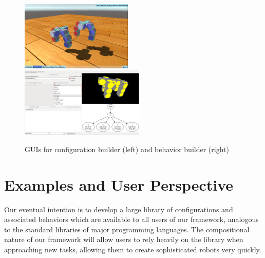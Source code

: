 \documentclass[graybox]{svmult}
\begin{document}
\begin{figure}
\begin{center}
    \includegraphics[height=1.3in]{images/library/unity/config_designer.png}
    \includegraphics[height=1.3in]{images/gait_window.png}
    \caption{GUIs for configuration builder (left) and behavior builder (right)}
    \label{fig:smores_conf}
\end{center}
\end{figure}

%
\section{Examples and User Perspective}
\label{sec:examples}
Our eventual intention is to develop a large library of configurations and associated
behaviors which are available to all users of our framework, analogous to the standard
libraries of major programming languages.  The compositional nature of our framework
will allow users to rely heavily on the library when approaching new tasks, allowing
them to create sophisticated robots very quickly.
\end{document}
